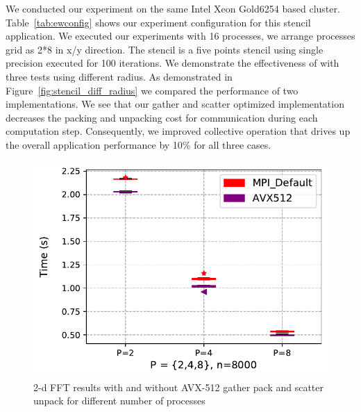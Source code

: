 \documentclass[conference]{IEEEtran}
\begin{document}
We conducted our experiment on the same Intel Xeon Gold6254 based cluster. Table~\ref{tab:ewconfig} shows our experiment configuration for this stencil application. We executed our experiments with 16 processes, we arrange processes grid as 2*8 in x/y direction. The stencil is a five points stencil using single precision executed for 100 iterations.
We demonstrate the effectiveness of \ourwork with three tests using different radius. As demonstrated in Figure~\ref{fig:stencil_diff_radius} we compared the performance of two implementations. We see that our gather and scatter
optimized implementation decreases the packing and unpacking cost for communication during each computation step.
Consequently, we improved collective operation that drives up the overall application performance by 10\% for all three cases.



\begin{figure}[h]
    \centering
    \includegraphics[width=\linewidth]{fft2_diff_p1.pdf}
    \caption{2-d FFT results with and without AVX-512 gather pack and scatter unpack for different number of processes}
    \label{fig:fft2_diff_p}
\end{figure}
\end{document}

